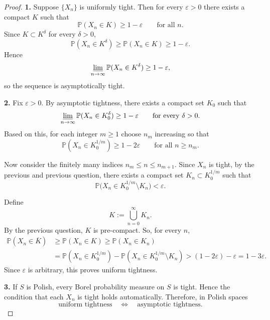 \documentclass[12pt]{article}
\renewcommand{\(}{\left(}%
\renewcommand{\)}{\right)}%
\renewcommand{\[}{\left[}%
\renewcommand{\]}{\right]}%
\newcommand{\p}{\mathbb{P}}
\newtheorem{proof}{Proof.}}
\begin{document}
\begin{proof}

\textbf{1.}
Suppose $\{X_n\}$ is uniformly tight. Then for every $\varepsilon>0$
there exists a compact $K$ such that
\begin{equation*}
\mathbb P(X_n\in K)\ge 1-\varepsilon \qquad \text{for all } n .
\end{equation*}
Since $K\subset K^\delta$ for every $\delta>0$,
\begin{equation*}
\mathbb P(X_n\in K^\delta)\ge \mathbb P(X_n\in K)\ge 1-\varepsilon .
\end{equation*}
Hence
\begin{equation*}
\varliminf_{n\to\infty}\mathbb P(X_n\in K^\delta)\ge 1-\varepsilon ,
\end{equation*}
so the sequence is asymptotically tight.

\medskip
\noindent
\textbf{2.}
Fix $\varepsilon>0$. By asymptotic tightness, there exists a compact set $K_0$ such that
\begin{equation*}
\varliminf_{n\to\infty}\mathbb P(X_n\in K_0^\delta)\ge 1-\varepsilon
\qquad \text{for every } \delta>0 .
\end{equation*}
Based on this, for each integer $m\ge1$ choose $n_m$ increasing so that
\begin{equation*}
\mathbb P(X_n\in K_0^{1/m})\ge 1-2\varepsilon
\qquad \text{for all } n\ge n_m .
\end{equation*}

Now consider the finitely many indices $n_m\le n\le n_{m+1}$.  
Since $X_n$ is tight, by the previous and previous question, there exists a compact set $K_n\subset K_0^{1/m}$ such that
\begin{equation*}
\mathbb P\bigl(X_n\in K_0^{1/m}\setminus K_n\bigr)<\varepsilon .
\end{equation*}

Define
\begin{equation*}
K:=\bigcup_{n=0}^{\infty}K_n .
\end{equation*}
By the previous question, $K$ is pre-compact. So, for every $n$,
\begin{equation*}
\begin{split}
	\mathbb P(X_n\in \overline{ K})&\geq\mathbb P(X_n\in K)
\ge \p(X_n\in K_n)\\
&=\mathbb P(X_n\in K_0^{1/m})-\mathbb P(X_n\in K_0^{1/m}\setminus K_n)
>
(1-2\varepsilon)-\varepsilon
=
1-3\varepsilon .
\end{split}
\end{equation*}
Since $\varepsilon$ is arbitrary, this proves uniform tightness.

\medskip
\noindent
\textbf{3.}
If $S$ is Polish, every Borel probability measure on $S$ is tight.
Hence the condition that each $X_n$ is tight holds automatically.
Therefore, in Polish spaces
\begin{equation*}
\text{uniform tightness}
\quad\Longleftrightarrow\quad
\text{asymptotic tightness}.
\end{equation*}
\end{proof}
\end{document}
